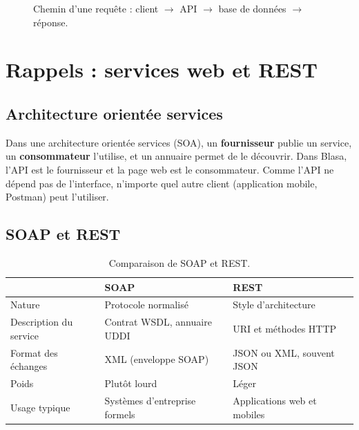 \documentclass[11pt,a4paper]{article}
\begin{document}
\begin{figure}[htbp]\centering
{}
\caption{Chemin d'une requ\^ete : client $\rightarrow$ API $\rightarrow$ base de donn\'ees $\rightarrow$ r\'eponse.}
\end{figure}

\section{Rappels : services web et REST}

\subsection{Architecture orient\'ee services}
Dans une architecture orient\'ee services (SOA), un \textbf{fournisseur} publie un service, un \textbf{consommateur} l'utilise, et un annuaire permet de le d\'ecouvrir. Dans Blasa, l'API est le fournisseur et la page web est le consommateur. Comme l'API ne d\'epend pas de l'interface, n'importe quel autre client (application mobile, Postman) peut l'utiliser.

\subsection{SOAP et REST}
\begin{table}[htbp]\centering
\begin{tabularx}{\textwidth}{@{}L{3cm}XX@{}}
\toprule
 & \textbf{SOAP} & \textbf{REST}\\
\midrule
Nature & Protocole normalis\'e & Style d'architecture\\
Description du service & Contrat WSDL, annuaire UDDI & URI et m\'ethodes HTTP\\
Format des \'echanges & XML (enveloppe SOAP) & JSON ou XML, souvent JSON\\
Poids & Plut\^ot lourd & L\'eger\\
Usage typique & Syst\`emes d'entreprise formels & Applications web et mobiles\\
\bottomrule
\end{tabularx}
\caption{Comparaison de SOAP et REST.}
\end{table}
\end{document}
